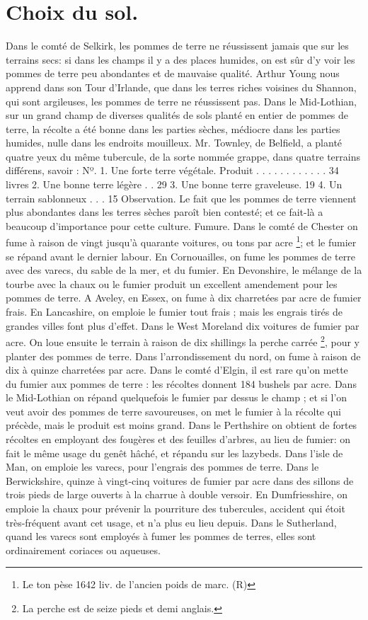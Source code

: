 \section{Choix du sol.}
Dans le comté de Selkirk, les pommes de terre ne réussissent jamais que sur les terrains secs: si dans les champs il y a des places humides, on est sûr d'y voir les pommes de terre peu abondantes et de mauvaise qualité. Arthur Young nous apprend dans son Tour d'Irlande, que dans les terres riches voisines du Shannon, qui sont argileuses, les pommes de terre ne réussissent pas.
Dans le Mid-Lothian, sur un grand champ de diverses qualités de sols planté en entier de pommes de terre, la récolte a été bonne\setcounter{page}{276} dans les parties sèches, médiocre dans les parties humides, nulle dans les endroits mouilleux.
Mr. Townley, de Belfield, a planté quatre yeux du même tubercule, de la sorte nommée grappe, dans quatre terrains différens, savoir :
Nº. 1. Une forte terre végétale. Produit . . . . . . . . . . . . 34 livres
2. Une bonne terre légère . . 29
3. Une bonne terre graveleuse. 19
4. Un terrain sablonneux . . . 15
Observation.
Le fait que les pommes de terre viennent plus abondantes dans les terres sèches paroît bien contesté; et ce fait-là a beaucoup d'importance pour cette culture.
Fumure.
Dans le comté de Chester on fume à raison de vingt jusqu'à quarante voitures, ou tons par acre \footnote{Le ton pèse 1642 liv. de l'ancien poids de marc. (R)}; et le fumier se répand avant le dernier labour.
En Cornouailles, on fume les pommes de\setcounter{page}{277} terre avec des varecs, du sable de la mer, et du fumier.
En Devonshire, le mélange de la tourbe avec la chaux ou le fumier produit un excellent amendement pour les pommes de terre.
A Aveley, en Essex, on fume à dix charretées par acre de fumier frais.
En Lancashire, on emploie le fumier tout frais ; mais les engrais tirés de grandes villes font plus d'effet.
Dans le West Moreland dix voitures de fumier par acre. On loue ensuite le terrain à raison de dix shillings la perche carrée \footnote{La perche est de seize pieds et demi anglais.}, pour y planter des pommes de terre.
Dans l'arrondissement du nord, on fume à raison de dix à quinze charretées par acre.
Dans le comté d'Elgin, il est rare qu'on mette du fumier aux pommes de terre : les récoltes donnent 184 bushels par acre.
Dans le Mid-Lothian on répand quelquefois le fumier par dessus le champ ; et si l'on veut avoir des pommes de terre savoureuses, on met le fumier à la récolte qui précède, mais le produit est moins grand.
Dans le Perthshire on obtient de fortes récoltes en employant des fougères et des\setcounter{page}{278} feuilles d'arbres, au lieu de fumier: on fait
le même usage du genêt hâché, et répandu
sur les lazybeds.
Dans l'isle de Man, on emploie les varecs,
pour l'engrais des pommes de terre.
Dans le Berwickshire, quinze à vingt-cinq
voitures de fumier par acre dans des sillons
de trois pieds de large ouverts à la charrue
à double versoir.
En Dumfriesshire, on emploie la chaux
pour prévenir la pourriture des tubercules,
accident qui étoit très-fréquent avant cet
usage, et n'a plus eu lieu depuis.
Dans le Sutherland, quand les varecs sont
employés à fumer les pommes de terres,
elles sont ordinairement coriaces ou aqueuses.

